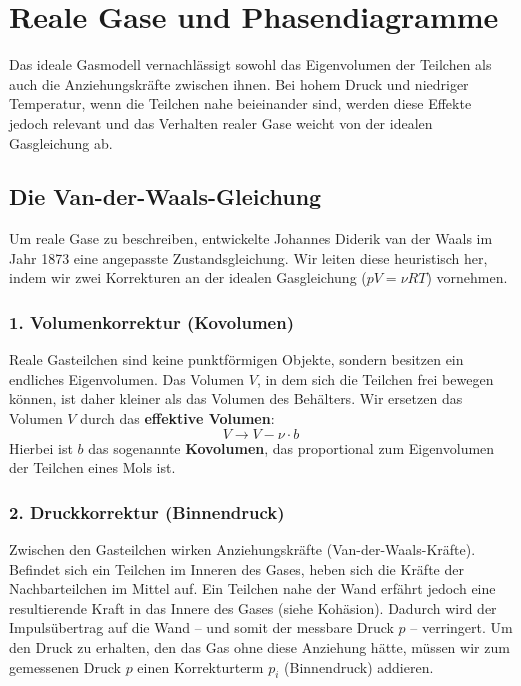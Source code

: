 \section{Reale Gase und Phasendiagramme}\label{sec: reale_gase_phasendiagramme}
Das ideale Gasmodell vernachlässigt sowohl das Eigenvolumen der Teilchen als auch die Anziehungskräfte zwischen ihnen. Bei hohem Druck und niedriger Temperatur, wenn die Teilchen nahe beieinander sind, werden diese Effekte jedoch relevant und das Verhalten realer Gase weicht von der idealen Gasgleichung ab.

\subsection{Die Van-der-Waals-Gleichung}\label{subsec: van_der_waals}
Um reale Gase zu beschreiben, entwickelte Johannes Diderik van der Waals im Jahr 1873 eine angepasste Zustandsgleichung. Wir leiten diese heuristisch her, indem wir zwei Korrekturen an der idealen Gasgleichung ($p V = \nu R T$) vornehmen.

\subsubsection*{1. Volumenkorrektur (Kovolumen)}
Reale Gasteilchen sind keine punktförmigen Objekte, sondern besitzen ein endliches Eigenvolumen. Das Volumen $V$, in dem sich die Teilchen frei bewegen können, ist daher kleiner als das Volumen des Behälters.
Wir ersetzen das Volumen $V$ durch das \textbf{effektive Volumen}:
\begin{equation}
    V \rightarrow V - \nu \cdot b
\end{equation}
Hierbei ist $b$ das sogenannte \textbf{Kovolumen}, das proportional zum Eigenvolumen der Teilchen eines Mols ist.

\subsubsection*{2. Druckkorrektur (Binnendruck)}
Zwischen den Gasteilchen wirken Anziehungskräfte (Van-der-Waals-Kräfte). Befindet sich ein Teilchen im Inneren des Gases, heben sich die Kräfte der Nachbarteilchen im Mittel auf. Ein Teilchen nahe der Wand erfährt jedoch eine resultierende Kraft in das Innere des Gases (siehe Kohäsion). Dadurch wird der Impulsübertrag auf die Wand -- und somit der messbare Druck $p$ -- verringert.
Um den Druck zu erhalten, den das Gas ohne diese Anziehung hätte, müssen wir zum gemessenen Druck $p$ einen Korrekturterm $p_{i}$ (Binnendruck) addieren.

